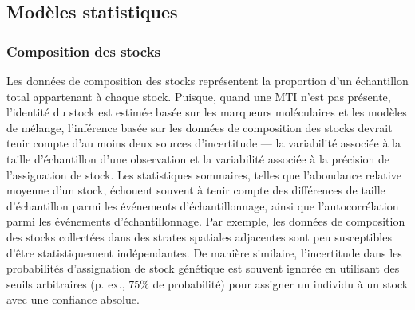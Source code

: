 \subsection{Modèles statistiques}

\subsubsection{Composition des stocks}

Les données de composition des stocks représentent la proportion d'un échantillon total appartenant à chaque stock. Puisque, quand une MTI n'est pas présente, l'identité du stock est estimée basée sur les marqueurs moléculaires et les modèles de mélange, l'inférence basée sur les données de composition des stocks devrait tenir compte d'au moins deux sources d'incertitude — la variabilité associée à la taille d'échantillon d'une observation et la variabilité associée à la précision de l'assignation de stock. Les statistiques sommaires, telles que l'abondance relative moyenne d'un stock, échouent souvent à tenir compte des différences de taille d'échantillon parmi les événements d'échantillonnage, ainsi que l'autocorrélation parmi les événements d'échantillonnage. Par exemple, les données de composition des stocks collectées dans des strates spatiales adjacentes sont peu susceptibles d'être statistiquement indépendantes. De manière similaire, l'incertitude dans les probabilités d'assignation de stock génétique est souvent ignorée en utilisant des seuils arbitraires (p. ex., 75\% de probabilité) pour assigner un individu à un stock avec une confiance absolue.

